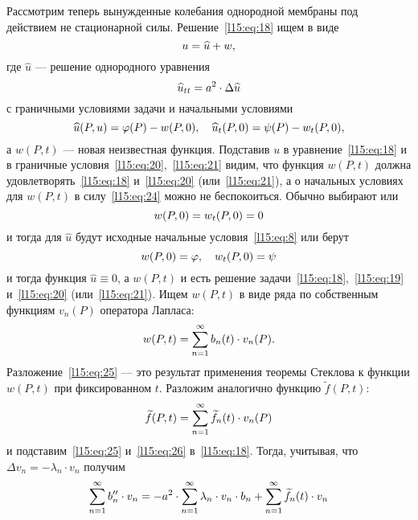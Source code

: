 \documentclass[12pt,a4paper,openany,fleqn]{book}
\theoremstyle{definition}
\begin{document}
	Рассмотрим теперь вынужденные колебания однородной мембраны под действием не стационарной силы. Решение~\eqref{l15:eq:18} ищем в виде
	\begin{equation*}
		\hfill u=\widehat{u}+w,\hfill
	\end{equation*}
	где $\widehat{u}$ --- решение однородного уравнения
	\begin{equation*}
		\hfill \widehat{u}_{tt}=a^2\cdot\Delta\widehat{u}\hfill
	\end{equation*}
	с граничными условиями задачи и начальными условиями 
	\begin{equation}\label{l15:eq:24}
		\hfill\widehat{u}(P,u)=\phi(P)-w(P,0),\quad \widehat{u}_t(P,0)=\psi(P)-w_t(P,0),\hfill
	\end{equation}
	а $w(P,t)$ --- новая неизвестная функция. Подставив $u$ в уравнение~\eqref{l15:eq:18} и в граничные условия~\eqref{l15:eq:20},~\eqref{l15:eq:21} видим, что функция $w(P,t)$ должна удовлетворять~\eqref{l15:eq:18} и~\eqref{l15:eq:20} (или~\eqref{l15:eq:21}), а о начальных условиях для $w(P,t)$ в силу~\eqref{l15:eq:24} можно не беспокоиться. Обычно выбирают или
	\begin{equation*}
		\hfill w(P,0)=w_t(P,0)=0\hfill
	\end{equation*} 
	и тогда для $\widehat{u}$ будут исходные начальные условия~\eqref{l15:eq:8} или берут 
		\begin{equation*}
		\hfill w(P,0)=\phi,\quad w_t(P,0)=\psi\hfill
	\end{equation*} 
	и тогда функция $\widehat{u}\equiv0$, а $w(P,t)$ и есть решение задачи~\eqref{l15:eq:18},~\eqref{l15:eq:19} и~\eqref{l15:eq:20} (или~\eqref{l15:eq:21}). Ищем $w(P,t)$ в виде ряда по собственным функциям $v_n(P)$ оператора Лапласа:
	\begin{equation}\label{l15:eq:25}
		\hfill w(P,t)=\sum\limits_{n=1}^{\infty}b_n(t)\cdot v_n(P).\hfill
	\end{equation}
	Разложение~\eqref{l15:eq:25} --- это результат применения теоремы Стеклова к функции $w(P,t)$ при фиксированном $t$. Разложим аналогично функцию $\widetilde{f}(P,t)$:
	\begin{equation}\label{l15:eq:26}
		\hfill\widetilde{f}(P,t)=\sum\limits_{n=1}^{\infty}\widetilde{f}_n(t)\cdot v_n(P)\hfill
	\end{equation}
	и подставим~\eqref{l15:eq:25} и~\eqref{l15:eq:26} в~\eqref{l15:eq:18}. Тогда, учитывая, что $\Delta v_n=-\lambda_n\cdot v_n$ получим 
	\begin{equation*}
		\hfill\sum\limits_{n=1}^{\infty}b_n''\cdot v_n=-a^2\cdot\sum\limits_{n=1}^{\infty}\lambda_n\cdot v_n\cdot b_n+\sum\limits_{n=1}^{\infty}\widetilde{f}_n(t)\cdot v_n\hfill
	\end{equation*}
\end{document}
